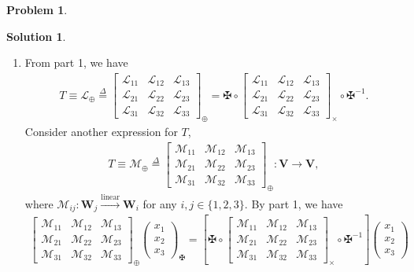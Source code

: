\documentclass{article}
\theoremstyle{definition}
\newtheorem*{prob*}{Problem}
\newtheorem*{sln*}{Solution}
\newcommand{\V}{\mathbf{V}}
\newcommand{\W}{\mathbf{W}}
\newcommand{\lag}{\mathcal{L}}
\newcommand{\M}{\mathcal{M}}
\newcommand{\lin}{\overset{\text{linear}}{\longrightarrow}}
\begin{document}
\begin{prob*}
\begin{sln*}
\begin{enumerate}
						
			\newpage
						
						
			\item From part 1, we have 
			\begin{align*}
			T \equiv \lag_\oplus \stackrel{\Delta}{=}\begin{bmatrix}
			\lag_{11} & \lag_{12} & \lag_{13}\\
			\lag_{21} & \lag_{22} & \lag_{23}\\
			\lag_{31} & \lag_{32} & \lag_{33}
			\end{bmatrix}_{\oplus} = 
			\maltese
			\circ
			\begin{bmatrix}
			\lag_{11} & \lag_{12} & \lag_{13}\\
			\lag_{21} & \lag_{22} & \lag_{23}\\
			\lag_{31} & \lag_{32} & \lag_{33}
			\end{bmatrix}_\times 
			\circ 
			\maltese^{-1}.
			\end{align*}
			Consider another expression for $T$, 
			\begin{align*}
			T \equiv \M_\oplus \stackrel{\Delta}{=}\begin{bmatrix}
			\M_{11} & \M_{12} & \M_{13}\\
			\M_{21} & \M_{22} & \M_{23}\\
			\M_{31} & \M_{32} & \M_{33}
			\end{bmatrix}_\oplus : \V \longrightarrow \V,
			\end{align*}
			where $\M_{ij} : \W _j \lin \W_i$ for any $i,j\in \{1,2,3 \}$. By part 1, we have
			\begin{align*}
			\begin{bmatrix}
			\M_{11} & \M_{12} & \M_{13}\\
			\M_{21} & \M_{22} & \M_{23}\\
			\M_{31} & \M_{32} & \M_{33}
			\end{bmatrix}_\oplus \begin{pmatrix}
			x_1\\x_2\\x_3
			\end{pmatrix}_{\maltese} = \left[\maltese
			\circ
			\begin{bmatrix}
			\M_{11} & \M_{12} & \M_{13}\\
			\M_{21} & \M_{22} & \M_{23}\\
			\M_{31} & \M_{32} & \M_{33}
			\end{bmatrix}_\times 
			\circ 
			\maltese^{-1}\right]\begin{pmatrix}
			x_1\\x_2\\x_3

\end{pmatrix}
\end{align*}
\end{enumerate}
\end{sln*}
\end{prob*}
\end{document}
